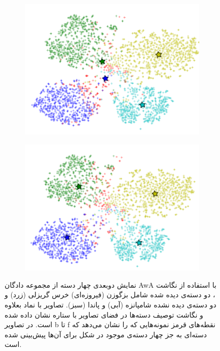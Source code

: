 \begin{figure}[t]
\begin{subfigure}[b]{0.38\linewidth}
    \includegraphics[width=\linewidth]{images/own_cluster}
    \caption{}
    \label{fig:clustering}
  \end{subfigure}
%
  \begin{subfigure}[b]{0.38\linewidth}
    \includegraphics[width=\linewidth]{images/jeac}
    \caption{}
    \label{fig:jeac}
  \end{subfigure}
  \caption[تحلیل قسمت‌های مختلف روش پیشنهادی]{
  نمایش دوبعدی چهار دسته از مجموعه دادگان AwA با استفاده از نگاشت ، دو دسته‌ی دیده شده شامل بزگوزن (فیروزه‌ای) خرس گریزلی (زرد) و دو دسته‌ی دیده نشده شامپانزه (آبی) و پاندا (سبز). تصاویر با نماد بعلاوه و نگاشت توصیف دسته‌ها در فضای تصاویر با ستاره نشان داده شده است. در تصاویر b تا f نقطه‌های قرمز نمونه‌هایی که را نشان می‌دهد که دسته‌ای به جز چهار دسته‌ی موجود در شکل برای آن‌ها پیش‌بینی شده است.
}
\end{figure}
